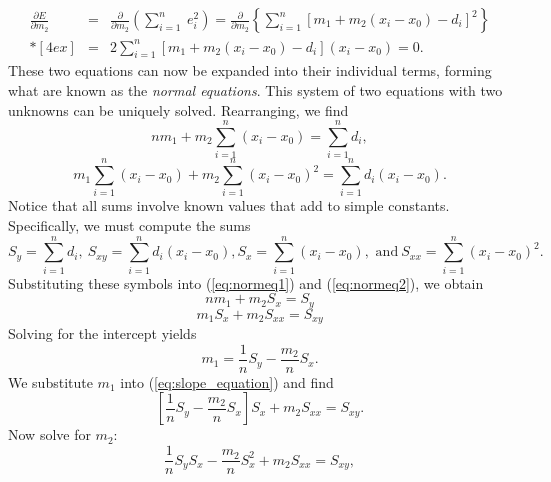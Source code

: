 \begin{equation}
\begin{array}{rcl}
\displaystyle
\frac{\partial E}{\partial m_2} & = & \displaystyle \frac{\partial}{\partial m_2} \left ( \sum^n_{i=1} \ e^2_i \right ) = \frac{\partial}{\partial m_2} \left \{ \sum^n_{i=1} \left [ m_1 + m_2 (x_i - x_0) - d_i \right ] ^2 \right \}\\*[4ex]
 & = & \displaystyle 2 \sum^n_{i=1} \left [ m_1 + m_2 (x_i - x_0) - d_i \right ](x_i - x_0) = 0.
\end{array}
\end{equation}
These two equations can now be expanded into their individual terms, forming what are known as 
the \emph{normal equations}.  This system of two equations with two unknowns can be uniquely 
solved. Rearranging, we find
\begin{equation}
nm_1 + m_2 \sum^n_{i=1} (x_i - x_0) = \sum^n_{i=1} d _i,
\label{eq:normeq1}
\end{equation}
\begin{equation}
m_1 \sum^n_{i=1} (x_i - x_0) + m_2 \sum^n_{i=1} (x_i - x_0)^2 = \sum^n_{i=1} d_i (x_i - x_0).
\label{eq:normeq2}
\end{equation}
Notice that all sums involve known values that add to simple constants. 
Specifically, we must compute the sums
\begin{equation}
S_y = \sum^n_{i=1} d_i, \ S_{xy} = \sum^n_{i=1}d_i (x_i - x_0), S_x = \sum^n_{i=1}(x_i - x_0), \mbox{ and} \ 
S_{xx} = \sum^n_{i=1}(x_i - x_0)^2.
\end{equation}
Substituting these symbols into (\ref{eq:normeq1}) and (\ref{eq:normeq2}), we obtain
\begin{equation}
nm_1 + m_2 S_x = S_y
\end{equation}
\begin{equation}
m_1 S_x + m_2 S_{xx} = S_{xy}
\label{eq:slope_equation}
\end{equation}
Solving for the intercept yields
\begin{equation}
m_1 = \frac{1}{n} S_y - \frac{m_2}{n} S_x.
\label{eq:intercept_equation}
\end{equation}
We substitute $m_1$ into (\ref{eq:slope_equation}) and find
\begin{equation}
\left [ \frac{1}{n} S_y - \frac{m_2}{n} S_x \right ] S_x + m_2 S_{xx} = S_{xy}.
\end{equation}
Now solve for $m_2$:
\begin{equation}
\frac{1}{n} S_y S_x - \frac{m_2}{n} S_x^2 + m_2 S_{xx} = S_{xy},
\end{equation}
